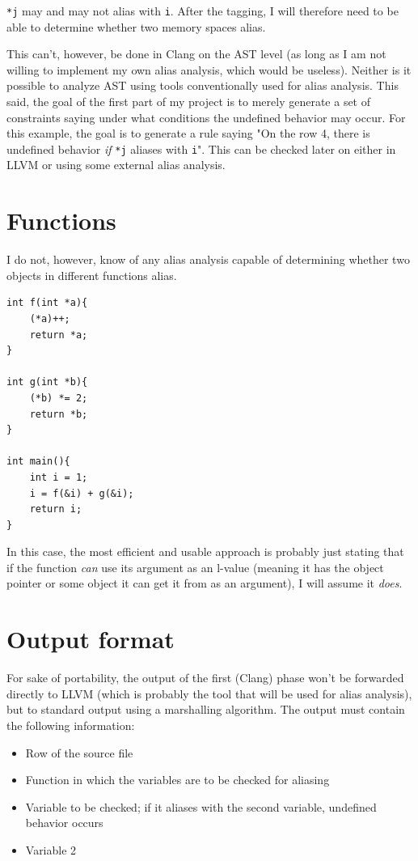 \verb|*j| may and may not alias with \verb|i|. After the tagging, I will therefore need to be able to determine whether two memory spaces alias.

This can't, however, be done in Clang on the AST level (as long as I am not willing to implement my own alias analysis, which would be useless). Neither is it possible to analyze AST using tools conventionally used for alias analysis. This said, the goal of the first part of my project is to merely generate a set of constraints saying under what conditions the undefined behavior may occur. For this example, the goal is to generate a rule saying "On the row 4, there is undefined behavior \emph{if} \verb|*j| aliases with \verb|i|". This can be checked later on either in LLVM or using some external alias analysis.

\section{Functions}
I do not, however, know of any alias analysis capable of determining whether two objects in different functions alias.

\begin{lstlisting}
int f(int *a){
    (*a)++;
    return *a;
}

int g(int *b){
    (*b) *= 2;
    return *b;
}

int main(){
    int i = 1;
    i = f(&i) + g(&i);
    return i;
}
\end{lstlisting}

In this case, the most efficient and usable approach is probably just stating that if the function \emph{can} use its argument as an l-value (meaning it has the object pointer or some object it can get it from as an argument), I will assume it \emph{does}.

\section{Output format}
For sake of portability, the output of the first (Clang) phase won't be forwarded directly to LLVM (which is probably the tool that will be used for alias analysis), but to standard output using a marshalling algorithm. The output must contain the following information:

\begin{itemize}
\item Row of the source file
\item Function in which the variables are to be checked for aliasing
\item Variable to be checked; if it aliases with the second variable, undefined behavior occurs
\item Variable 2
\end{itemize}

